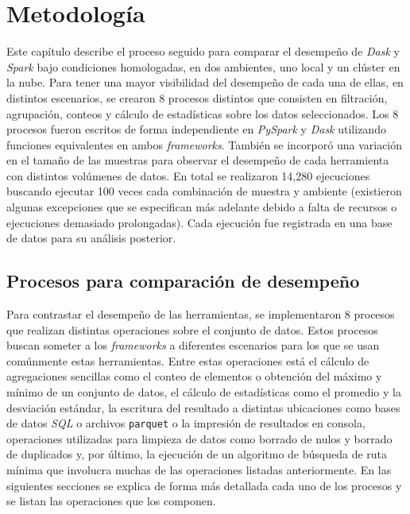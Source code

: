 \chapter{Metodología}

\noindent Este capítulo describe el proceso seguido para comparar el desempeño de \textit{Dask} y \textit{Spark} bajo condiciones homologadas, en dos ambientes, uno local y un clúster en la nube. Para tener una mayor visibilidad del desempeño de cada una de ellas, en distintos escenarios, se crearon 8 procesos distintos que consisten en filtración, agrupación, conteos y cálculo de estadísticas sobre los datos seleccionados. Los 8 procesos fueron escritos de forma independiente en \textit{PySpark} y \textit{Dask} utilizando funciones equivalentes en ambos \textit{frameworks}. También se incorporó una variación en el tamaño de las muestras para observar el desempeño de cada herramienta con distintos volúmenes de datos. En total se realizaron 14,280 ejecuciones buscando ejecutar 100 veces cada combinación de muestra y ambiente (existieron algunas excepciones que se especifican más adelante debido a falta de recursos o ejecuciones demasiado prolongadas). Cada ejecución fue registrada en una base de datos para su análisis posterior.
\newpage

\section{Procesos para comparación de desempeño}

Para contrastar el desempeño de las herramientas, se implementaron 8 procesos que realizan distintas operaciones sobre el conjunto de datos. Estos procesos buscan someter a los \textit{frameworks} a diferentes escenarios para los que se usan comúnmente estas herramientas. Entre estas operaciones está el cálculo de agregaciones sencillas como el conteo de elementos o obtención del máximo y mínimo de un conjunto de datos, el cálculo de estadísticas como el promedio y la desviación estándar, la escritura del resultado a distintas ubicaciones como bases de datos \textit{SQL} o archivos \texttt{parquet} o la impresión de resultados en consola, operaciones utilizadas para limpieza de datos como borrado de nulos y borrado de duplicados y, por último, la ejecución de un algoritmo de búsqueda de ruta mínima que involucra muchas de las operaciones listadas anteriormente. En las siguientes secciones se explica de forma más detallada cada uno de los procesos y se listan las operaciones que los componen.

